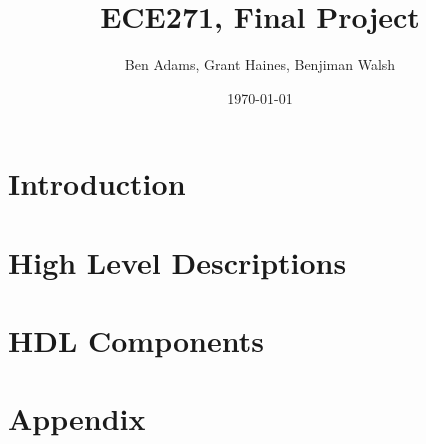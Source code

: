 \documentclass[a4paper]{article}
\title{ECE271, Final Project}
\author{Ben Adams, Grant Haines, Benjiman Walsh}
\date{\today}
\begin{document}
\maketitle

\pagebreak

\section{Introduction}


\section{High Level Descriptions}%


\section{HDL Components}

\section{Appendix}


%
\end{document}
